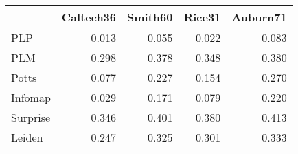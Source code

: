 \begin{tabular}{lrrrr}
\toprule
{} & Caltech36 & Smith60 & Rice31 & Auburn71 \\
\midrule
PLP      &     0.013 &   0.055 &  0.022 &    0.083 \\
PLM      &     0.298 &   0.378 &  0.348 &    0.380 \\
Potts    &     0.077 &   0.227 &  0.154 &    0.270 \\
Infomap  &     0.029 &   0.171 &  0.079 &    0.220 \\
Surprise &     0.346 &   0.401 &  0.380 &    0.413 \\
Leiden   &     0.247 &   0.325 &  0.301 &    0.333 \\
\bottomrule
\end{tabular}
